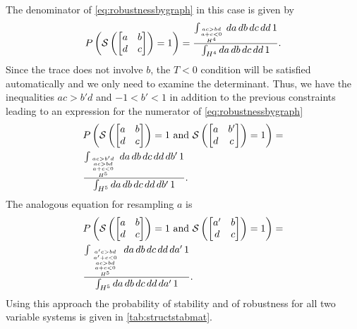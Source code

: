 The denominator of \ref{eq:robustnessbygraph} in this case is given by
\begin{align*}
P\left(\mathcal{S} \left( \begin{bmatrix}
a & b \\
d & c
\end{bmatrix} \right) = 1 \right) = \frac{\int_{\genfrac{}{}{0pt}{}{\genfrac{}{}{0pt}{}{ac>bd}{a+c<0}}{H^4}} da\,db\,dc\,dd\,1}{\int_{H^4} da\,db\,dc\,dd\,1}.
\end{align*}
Since the trace does not involve $b$, the $T<0$ condition will be satisfied automatically and we only need to examine the determinant. Thus, we have the inequalities $ac > b'd$ and $-1 < b' < 1$ in addition to the previous constraints leading to an expression for the numerator of \ref{eq:robustnessbygraph}
\begin{align*}
& P\left(\mathcal{S} \left( \begin{bmatrix}
a & b \\
d & c
\end{bmatrix} \right)=1 \textrm{ and } \mathcal{S} \left( \begin{bmatrix}
a & b' \\
d & c
\end{bmatrix} \right)=1 \right) = \\
& \frac{\int_{{{ac>b'd \atop ac>bd} \atop a+c<0} \atop H^5} da\,db\,dc\,dd\,db'\,1}{\int_{H^5} da\,db\,dc\,dd\,db'\,1}.
\end{align*}
The analogous equation for resampling $a$ is
\begin{align*}
& P\left(\mathcal{S} \left( \begin{bmatrix}
a & b \\
d & c
\end{bmatrix} \right)=1 \textrm{ and } \mathcal{S}
\left( \begin{bmatrix}
a' & b \\
d & c
\end{bmatrix} \right)=1 \right) = \\
& \frac{\int_{{{{a'c>bd \atop a' + c < 0} \atop ac>bd} \atop a+c<0} \atop H^5} da\,db\,dc\,dd\,da'\,1}{\int_{H^5} da\,db\,dc\,dd\,da'\,1}.
\end{align*}
Using this approach the probability of stability and of robustness for all two variable systems is given in \ref{tab:structstabmat}.

